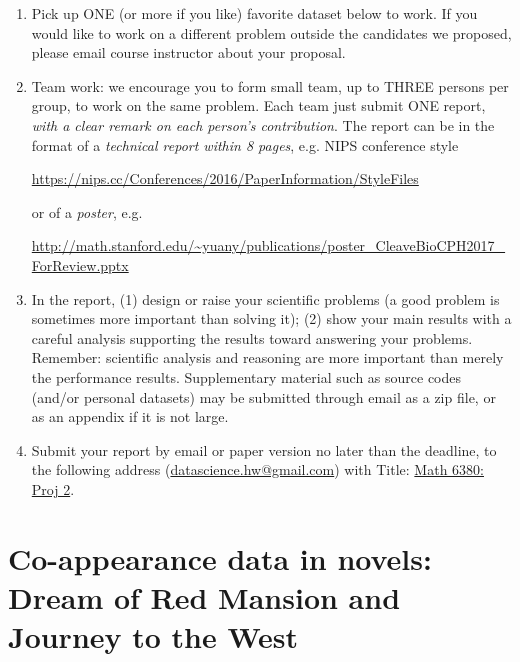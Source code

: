 \documentclass[11pt]{article}
\begin{document}
\begin{enumerate}
\item Pick up ONE (or more if you like) favorite dataset below to work. If you would like to work on a different problem outside the candidates we proposed, please email course instructor about your proposal.  
\item Team work: we encourage you to form small team, up to THREE persons per group, to work on the same problem. Each team just submit ONE report, \emph{with a clear remark on each person's contribution}. The report can be in the format of a \emph{technical report within 8 pages}, e.g. NIPS conference style 
\begin{center}
\url{https://nips.cc/Conferences/2016/PaperInformation/StyleFiles} 
\end{center}
or of a \emph{poster}, e.g. 
\begin{center}\url{http://math.stanford.edu/~yuany/publications/poster_CleaveBioCPH2017_ForReview.pptx}
\end{center}
\item In the report, (1) design or raise your scientific problems (a good problem is sometimes more important than solving it); (2) show your main results with a careful analysis supporting the results toward answering your problems. Remember: scientific analysis and reasoning are more important than merely the performance results. Supplementary material such as source codes (and/or personal datasets) may be submitted through email as a zip file, or as an appendix if it is not large.    
\item Submit your report by email or paper version no later than the deadline, to the following address (\href{mailto:datascience.hw@gmail.com}{datascience.hw@gmail.com}) with Title: \underline{Math 6380: Proj 2}. %
\end{enumerate}

\section{Co-appearance data in novels: Dream of Red Mansion and Journey to the West}
\end{document}
